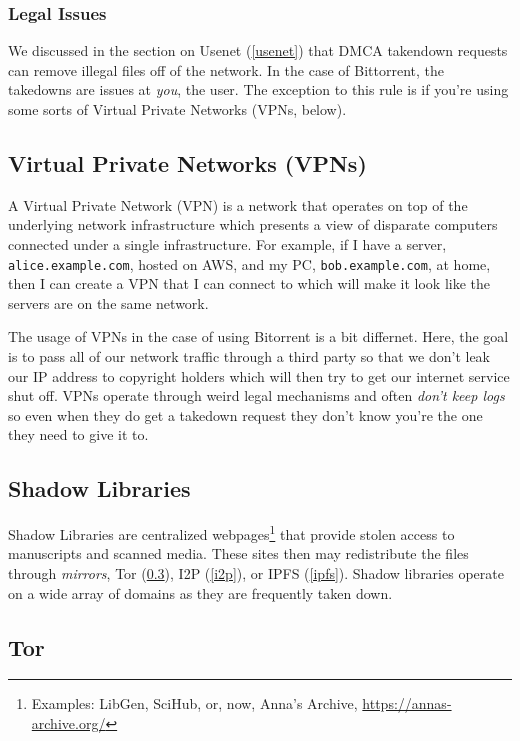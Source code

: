 \subsubsection{Legal Issues}

We discussed in the section on Usenet (\ref{usenet}) that DMCA takendown
requests can remove illegal files off of the network. In the case of Bittorrent,
the takedowns are issues at \emph{you}, the user. The exception to this rule is
if you're using some sorts of Virtual Private Networks (VPNs, below).

\subsection{Virtual Private Networks (VPNs)}\label{vpn}

A Virtual Private Network (VPN) is a network that operates on top of the
underlying network infrastructure which presents a view of disparate computers
connected under a single infrastructure. For example, if I have a server,
\texttt{alice.example.com}, hosted on AWS, and my PC, \texttt{bob.example.com},
at home, then I can create a VPN that I can connect to which will make it look
like the servers are on the same network.

The usage of VPNs in the case of using Bitorrent is a bit differnet. Here, the
goal is to pass all of our network traffic through a third party so that we
don't leak our IP address to copyright holders which will then try to get our
internet service shut off. VPNs operate through weird legal mechanisms and often
\emph{don't keep logs} so even when they do get a takedown request they don't
know you're the one they need to give it to.

\subsection{Shadow Libraries}

Shadow Libraries are centralized webpages\footnote{Examples: LibGen, SciHub, or,
      now, Anna's Archive, \url{https://annas-archive.org/}} that provide stolen
access to manuscripts and scanned media. These sites then may redistribute
the files through \emph{mirrors}, Tor (\ref{tor}), I2P (\ref{i2p}), or
IPFS (\ref{ipfs}). Shadow libraries operate on a wide array of domains as
they are frequently taken down.

\subsection{Tor}\label{tor}

